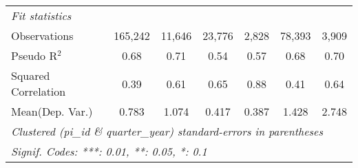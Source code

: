 \begin{tabular}{lcccccc}
   \midrule
   \emph{Fit statistics}\\
   Observations                                               & 165,242        & 11,646  & 23,776       & 2,828         & 78,393       & 3,909\\  
   Pseudo R$^2$                                               & 0.68           & 0.71    & 0.54         & 0.57          & 0.68         & 0.70\\  
   Squared Correlation                                        & 0.39           & 0.61    & 0.65         & 0.88          & 0.41         & 0.64\\  
Mean(Dep. Var.) & 0.783 & 1.074 & 0.417 & 0.387 & 1.428 & 2.748 \\
   \midrule \midrule
   \multicolumn{7}{l}{\emph{Clustered (pi\_id \& quarter\_year) standard-errors in parentheses}}\\
   \multicolumn{7}{l}{\emph{Signif. Codes: ***: 0.01, **: 0.05, *: 0.1}}\\
\end{tabular}
\par\endgroup
